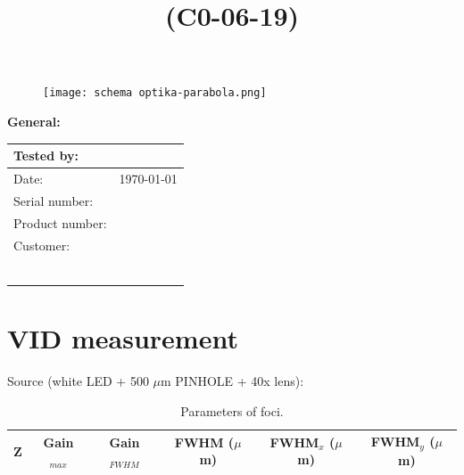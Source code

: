 \documentclass{article}
\title{\textbf{\textcolor{ultramarine}{\Optics{} (C0-06-19)}}}
\date{\textbf{\textcolor{ultramarine}{\ReportName{}}}}
\newcommand{\SerialNumber}{\text{037}}
\newcommand{\Optics}{\text{037-066}}
\newcommand{\Author}{\text{Veronika Marsikova}}
\newcommand{\Customer}{\text{BRU}}
\begin{document}
 \maketitle
 \thispagestyle{fancy} %
\captionsetup[subfigure]{singlelinecheck=off, justification=centering}

\begin{figure}[ht]
    \begin{center}
    \texttt{[image: schema optika-parabola.png]}
    \end{center}
    \label{fig:optika}
\end{figure}


\textbf{\textcolor{ultramarine}{General:}}\\
\begin{center}
    	\renewcommand{\arraystretch}{1.15} %
    \begin{tabular}{|p{7cm}|p{7cm}|}
\hline
Tested by:&			\Author{}\\	\hline
Date:&				\today\\	\hline
Serial number:&		\SerialNumber{}\\	\hline
Product number:&	\Optics{}\\	\hline
Customer:&			\Customer{}\\
&						\\
&						\\
&						\\
&						\\
&						\\
&						\\
	\hline
    \end{tabular}
\end{center}

\clearpage

\newpage

\section{VID measurement}

Source (white LED + 500 $\mu$m PINHOLE + 40x lens):
\begin{table}[h]
    \centering
    \begin{tabular}{c c c c c c}
  	Z & Gain$_{max}$ & Gain$_{FWHM}$ & FWHM ($\mu$m) & FWHM$_x$ ($\mu$m) &FWHM$_y$ ($\mu$m)\\
  	\hline
  	\hline


\end{tabular}
 \caption{Parameters of foci.}
\label{tab:01}
\end{table}
\end{document}
